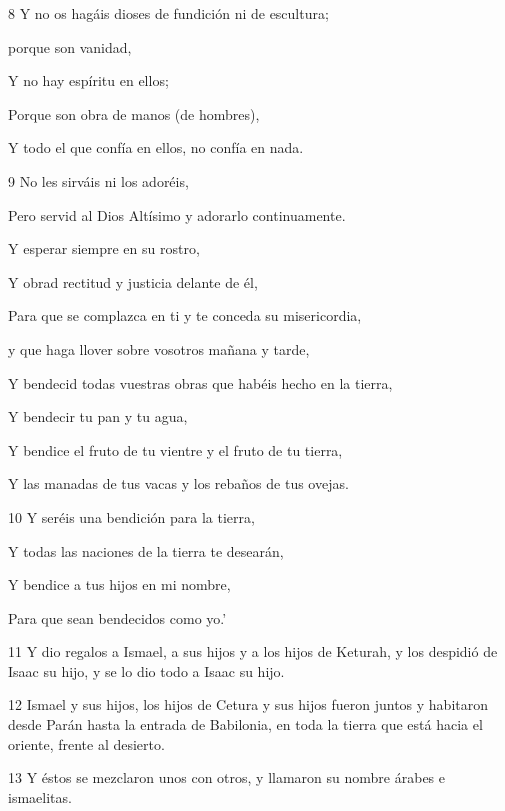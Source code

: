 \par    
\par 8 Y no os hagáis dioses de fundición ni de escultura;
\par    
\par     porque son vanidad,  
\par     Y no hay espíritu en ellos;
\par    
\par     Porque son obra de manos (de hombres),  
\par     Y todo el que confía en ellos, no confía en nada.
\par    
\par 9 No les sirváis ni los adoréis,  
\par     Pero servid al Dios Altísimo y adorarlo continuamente.  
\par     Y esperar siempre en su rostro,  
\par     Y obrad rectitud y justicia delante de él,
\par    
\par     Para que se complazca en ti y te conceda su misericordia,  
\par     y que haga llover sobre vosotros mañana y tarde,
\par    
\par     Y bendecid todas vuestras obras que habéis hecho en la tierra,  
\par     Y bendecir tu pan y tu agua,
\par    
\par     Y bendice el fruto de tu vientre y el fruto de tu tierra,  
\par     Y las manadas de tus vacas y los rebaños de tus ovejas.
\par    
\par 10 Y seréis una bendición para la tierra,  
\par     Y todas las naciones de la tierra te desearán,
\par    
\par     Y bendice a tus hijos en mi nombre,  
\par     Para que sean bendecidos como yo.'
\par    
\par 11 Y dio regalos a Ismael, a sus hijos y a los hijos de Keturah, y los despidió de Isaac su hijo, y se lo dio todo a Isaac su hijo.
\par 12 Ismael y sus hijos, los hijos de Cetura y sus hijos fueron juntos y habitaron desde Parán hasta la entrada de Babilonia, en toda la tierra que está hacia el oriente, frente al desierto.
\par 13 Y éstos se mezclaron unos con otros, y llamaron su nombre árabes e ismaelitas.


